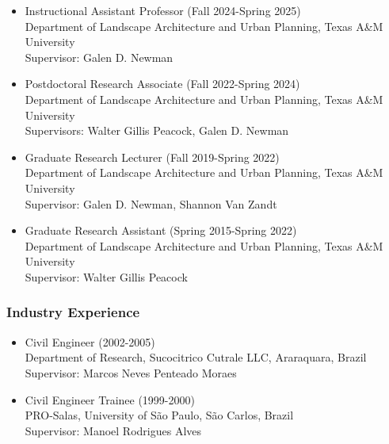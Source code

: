 \documentclass[11pt,oneside]{article}
\begin{document}
\begin{itemize}[leftmargin=40pt, label={-}]
\item {\frutigerregular Instructional Assistant Professor} (Fall 2024-Spring 2025)\\
	  {Department of Landscape Architecture and Urban Planning, Texas A\&M University}\\
      Supervisor: Galen D. Newman
\item {\frutigerregular Postdoctoral Research Associate} (Fall 2022-Spring 2024)\\
	  {Department of Landscape Architecture and Urban Planning, Texas A\&M University}\\
      Supervisors: Walter Gillis Peacock, Galen D. Newman
\item {\frutigerregular Graduate Research Lecturer} (Fall 2019-Spring 2022)\\
	  {Department of Landscape Architecture and Urban Planning, Texas A\&M University}\\
      Supervisor: Galen D. Newman, Shannon Van Zandt
\item {\frutigerregular Graduate Research Assistant} (Spring 2015-Spring 2022)\\
	  {Department of Landscape Architecture and Urban Planning, Texas A\&M University}\\
      Supervisor: Walter Gillis Peacock
\end{itemize}

\newpage
\pagestyle{main}

\subsubsection{Industry Experience}
\begin{itemize}[leftmargin=40pt, label={-}]
\item {\frutigerregular Civil Engineer} (2002-2005)\\
      Department of Research, Sucocitrico Cutrale LLC, Araraquara, Brazil\\
      Supervisor: Marcos Neves Penteado Moraes\\
\item {\frutigerregular Civil Engineer Trainee} (1999-2000)\\
      PRO-Salas, University of São Paulo, São Carlos, Brazil\\
      Supervisor: Manoel Rodrigues Alves\\
\end{itemize}
\end{document}
